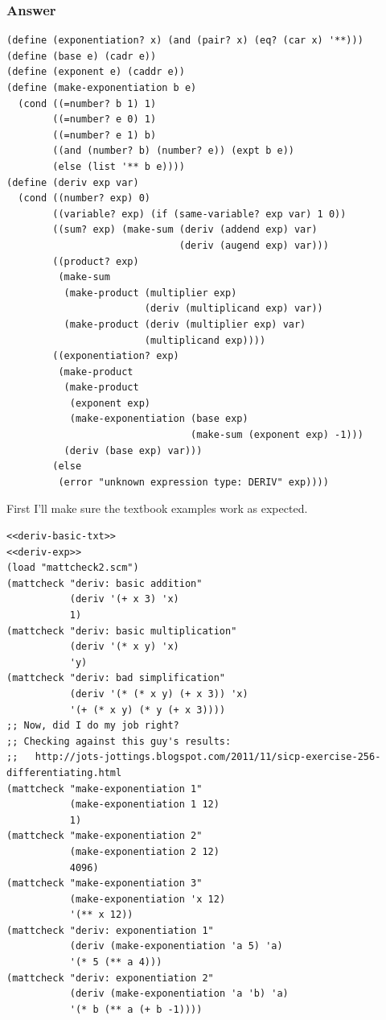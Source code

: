 \documentclass[final,fleqn,titlepage,twoside]{article}
\begin{document}
\subsubsection{Answer}
\label{sec:orgac51c59}
\begin{verbatim}
(define (exponentiation? x) (and (pair? x) (eq? (car x) '**)))
(define (base e) (cadr e))
(define (exponent e) (caddr e))
(define (make-exponentiation b e)
  (cond ((=number? b 1) 1)
        ((=number? e 0) 1)
        ((=number? e 1) b)
        ((and (number? b) (number? e)) (expt b e))
        (else (list '** b e))))
(define (deriv exp var)
  (cond ((number? exp) 0)
        ((variable? exp) (if (same-variable? exp var) 1 0))
        ((sum? exp) (make-sum (deriv (addend exp) var)
                              (deriv (augend exp) var)))
        ((product? exp)
         (make-sum
          (make-product (multiplier exp)
                        (deriv (multiplicand exp) var))
          (make-product (deriv (multiplier exp) var)
                        (multiplicand exp))))
        ((exponentiation? exp)
         (make-product  
          (make-product  
           (exponent exp) 
           (make-exponentiation (base exp) 
                                (make-sum (exponent exp) -1)))                                                                                               
          (deriv (base exp) var)))
        (else
         (error "unknown expression type: DERIV" exp))))
\end{verbatim}

First I'll make sure the textbook examples work as expected.
\begin{verbatim}
<<deriv-basic-txt>>
<<deriv-exp>>
(load "mattcheck2.scm")
(mattcheck "deriv: basic addition"
           (deriv '(+ x 3) 'x)
           1)
(mattcheck "deriv: basic multiplication"
           (deriv '(* x y) 'x)
           'y)
(mattcheck "deriv: bad simplification"
           (deriv '(* (* x y) (+ x 3)) 'x)
           '(+ (* x y) (* y (+ x 3))))
;; Now, did I do my job right?
;; Checking against this guy's results:
;;   http://jots-jottings.blogspot.com/2011/11/sicp-exercise-256-differentiating.html
(mattcheck "make-exponentiation 1"
           (make-exponentiation 1 12)
           1)
(mattcheck "make-exponentiation 2"
           (make-exponentiation 2 12)
           4096)
(mattcheck "make-exponentiation 3"
           (make-exponentiation 'x 12)
           '(** x 12))
(mattcheck "deriv: exponentiation 1"
           (deriv (make-exponentiation 'a 5) 'a)
           '(* 5 (** a 4)))
(mattcheck "deriv: exponentiation 2"
           (deriv (make-exponentiation 'a 'b) 'a)
           '(* b (** a (+ b -1))))
\end{verbatim}
\end{document}

